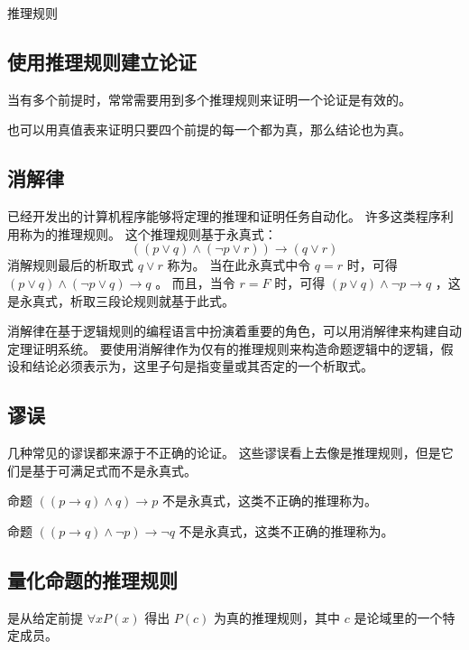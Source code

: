 {{\begin{table}[htb]
            \caption{推理规则}
        \end{table}
    }

    \subsection{使用推理规则建立论证}
    {
        当有多个前提时，常常需要用到多个推理规则来证明一个论证是有效的。

        也可以用真值表来证明只要四个前提的每一个都为真，那么结论也为真。
    }

    \subsection{消解律}
    {
        已经开发出的计算机程序能够将定理的推理和证明任务自动化。
        许多这类程序利用称为的推理规则。
        这个推理规则基于永真式：
        $$((p \vee q) \wedge (\neg p \vee r)) \rightarrow (q \vee r)$$
        消解规则最后的析取式 $q \vee r$ 称为。
        当在此永真式中令 $q = r$ 时，可得 $(p \vee q) \wedge (\neg p \vee q) \rightarrow q$ 。
        而且，当令 $r = F$ 时，可得 $(p \vee q) \wedge \neg p \rightarrow q$ ，这是永真式，析取三段论规则就基于此式。

        消解律在基于逻辑规则的编程语言中扮演着重要的角色，可以用消解律来构建自动定理证明系统。
        要使用消解律作为仅有的推理规则来构造命题逻辑中的逻辑，假设和结论必须表示为，这里子句是指变量或其否定的一个析取式。
    }

    \subsection{谬误}
    {
        几种常见的谬误都来源于不正确的论证。
        这些谬误看上去像是推理规则，但是它们是基于可满足式而不是永真式。

        命题 $((p \rightarrow q) \wedge q) \rightarrow p$ 不是永真式，这类不正确的推理称为。

        命题 $((p \rightarrow q )\wedge \neg p) \rightarrow \neg q$ 不是永真式，这类不正确的推理称为。
    }

    \subsection{量化命题的推理规则}
    {
        是从给定前提 $\forall x P(x)$ 得出 $P(c)$ 为真的推理规则，其中 $c$ 是论域里的一个特定成员。

}}
